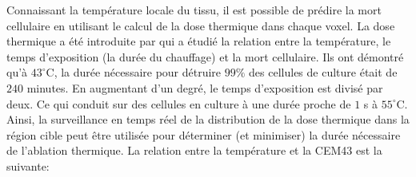 Connaissant la température locale du tissu, il est possible de prédire la mort cellulaire en utilisant le calcul de la dose thermique dans chaque voxel. La dose thermique a été introduite par \cite{sapareto1984thermal} qui a étudié la relation entre la température, le temps d'exposition (la durée du chauffage) et la mort cellulaire. Ils ont démontré qu'à $43^\circ$C, la durée nécessaire pour détruire $99\%$ des cellules de culture était de $240$ minutes. En augmentant d'un degré, le temps d'exposition est divisé par deux. Ce qui conduit sur des cellules en culture à une durée proche de $1$ s à $55^\circ$C. Ainsi, la surveillance en temps réel de la distribution de la dose thermique dans la région cible peut être utilisée pour déterminer (et minimiser) la durée nécessaire de l'ablation thermique. La relation entre la température et la \ac{CEM43} est la suivante:

